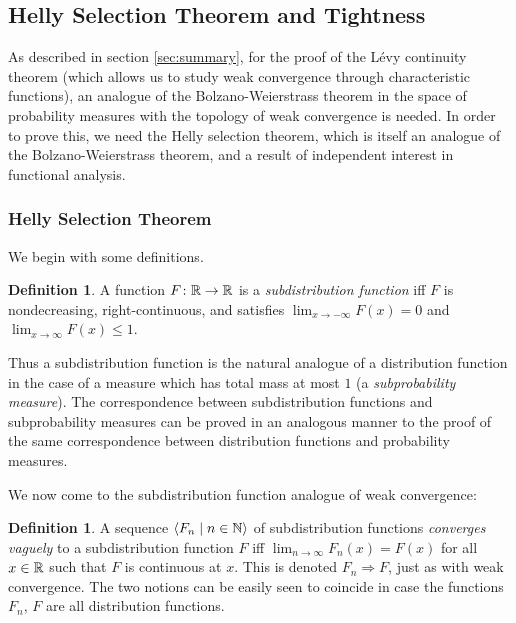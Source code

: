 \documentclass[leqno]{article}
\theoremstyle{definition}
\newtheorem{definition}[theorem]{Definition}
\newcommand{\bldseq}[2]{\langle{#1}\mid{#2}\rangle}
\begin{document}
\subsection{Helly Selection Theorem and Tightness} \label{sec:helly}

As described in section \ref{sec:summary}, for the proof of the L\'evy continuity theorem (which allows us to study weak convergence through characteristic functions), an analogue of the Bolzano-Weierstrass theorem in the space of probability measures with the topology of weak convergence is needed. In order to prove this, we need the Helly selection theorem, which is itself an analogue of the Bolzano-Weierstrass theorem, and a result of independent interest in functional analysis.

\subsubsection{Helly Selection Theorem}

We begin with some definitions.

\begin{definition} \label{def:subdist}
A function $F\colon \mathbb{R} \rightarrow \mathbb{R}$ is a {\em subdistribution function} iff $F$ is nondecreasing, right-continuous, and satisfies $\lim_{x \rightarrow -\infty} F(x) = 0$ and \linebreak $\lim_{x \rightarrow \infty} F(x) \le 1$.
\end{definition}

Thus a subdistribution function is the natural analogue of a distribution function in the case of a measure which has total mass at most $1$ (a {\em subprobability measure}). The correspondence between subdistribution functions and subprobability measures can be proved in an analogous manner to the proof of the same correspondence between distribution functions and probability measures.

We now come to the subdistribution function analogue of weak convergence:

\begin{definition} \label{def:vague}
A sequence $\bldseq{F_n}{n \in \N}$ of subdistribution functions {\em converges vaguely} to a subdistribution function $F$ iff $\lim_{n \rightarrow \infty} F_n(x) = F(x)$ for all $x \in \mathbb{R}$ such that $F$ is continuous at $x$. This is denoted $F_n \Rightarrow F$, just as with weak convergence. The two notions can be easily seen to coincide in case the functions $F_n$, $F$ are all distribution functions.
\end{definition}
\end{document}
